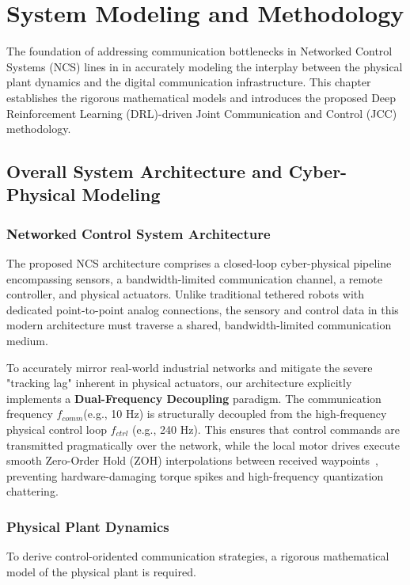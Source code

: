\section{System Modeling and Methodology}
The foundation of addressing communication bottlenecks in Networked Control Systems (NCS) lines in in accurately modeling the interplay between 
the physical plant dynamics and the digital communication infrastructure. This chapter establishes the rigorous mathematical models and introduces 
the proposed Deep Reinforcement Learning (DRL)-driven Joint Communication and Control (JCC) methodology.
\subsection{Overall System Architecture and Cyber-Physical Modeling}
\subsubsection{Networked Control System Architecture}
The proposed NCS architecture comprises a closed-loop cyber-physical pipeline encompassing sensors, a bandwidth-limited communication channel, a remote controller, and physical actuators. 
Unlike traditional tethered robots with dedicated point-to-point analog connections, the sensory and control data in this modern architecture must traverse a shared, bandwidth-limited communication medium.

To accurately mirror real-world industrial networks and mitigate the severe "tracking lag" inherent in physical actuators, our architecture explicitly implements 
a \textbf{Dual-Frequency Decoupling} paradigm. The communication frequency $f_{comm}$(e.g., 10 Hz) is structurally decoupled from the high-frequency physical control loop $f_{ctrl}$ (e.g., 240 Hz).
This ensures that control commands are transmitted pragmatically over the network, while the local motor drives execute smooth Zero-Order Hold (ZOH) interpolations between received waypoints~\cite{CCSTD}, preventing hardware-damaging torque spikes and high-frequency quantization chattering.

\subsubsection{Physical Plant Dynamics}
To derive control-oridented communication strategies, a rigorous mathematical model of the physical plant is required.\\

